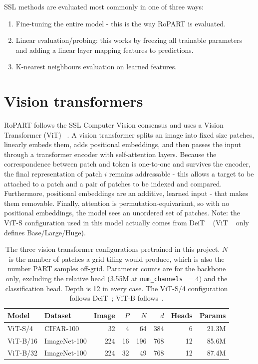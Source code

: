 \documentclass[final_report.tex]{subfiles}
\begin{document}
SSL methods are evaluated most commonly in one of three ways:
\begin{enumerate}
\item Fine-tuning the entire model - this is the way RoPART is evaluated.
\item Linear evaluation/probing: this works by freezing all trainable parameters and adding a linear layer mapping features to predictions.
\item K-nearest neighbours evaluation on learned features.
\end{enumerate}


\section{Vision transformers}\label{sec:vit}
RoPART follows the SSL Computer Vision consensus and uses a Vision Transformer (ViT) ~\cite{vit}.  A vision transformer splits an image into fixed size patches, linearly embeds them, adds positional embeddings, and then passes the input through a transformer encoder with self-attention layers. Because the correspondence between patch and token is one-to-one and survives the encoder, the final representation of patch $i$ remains addressable - this allows a target to be attached to a patch and a pair of patches to be indexed and compared. Furthermore, positional embeddings are an additive, learned input - that makes them removable. Finally, attention is permutation-equivariant, so with no positional embeddings, the model sees an unordered set of patches. Note: the ViT-S configuration used in this model actually comes from DeiT ~\cite{deit} (ViT ~\cite{vit} only defines Base/Large/Huge). 


\begin{table}[htbp]
  \centering
  \caption[Vision transformer configurations used in this project]{The three vision
  transformer configurations pretrained in this project. $N$ is the number of patches a
  grid tiling would produce, which is also the number PART samples off-grid. Parameter
  counts are for the backbone only, excluding the relative head (3.55M at
  \texttt{num\_channels}~$=4$) and the classification head. Depth is 12 in every case.
  The ViT-S/4 configuration follows DeiT~\cite{deit}; ViT-B follows~\cite{vit}.}
  \label{tab:vit-configs}
  \begin{tabular}{llrrrrrr}
    \toprule
    Model     & Dataset      & Image & $P$ & $N$ & $d$ & Heads & Params \\
    \midrule
    ViT-S/4   & CIFAR-100    & 32    & 4   & 64  & 384 & 6     & 21.3M \\
    ViT-B/16  & ImageNet-100 & 224   & 16  & 196 & 768 & 12    & 85.6M \\
    ViT-B/32  & ImageNet-100 & 224   & 32  & 49  & 768 & 12    & 87.4M \\
    \bottomrule
  \end{tabular}
\end{table}
\end{document}
